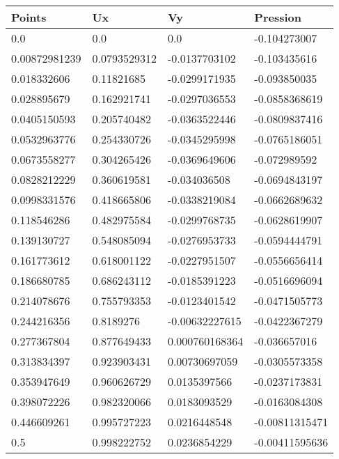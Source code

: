 \begin{tabular}{llll}
	Points & Ux & Vy & Pression \\ 
\midrule 
	0.0 & 0.0 & 0.0 & -0.104273007 \\ 
	0.00872981239 & 0.0793529312 & -0.0137703102 & -0.103435616 \\ 
	0.018332606 & 0.11821685 & -0.0299171935 & -0.093850035 \\ 
	0.028895679 & 0.162921741 & -0.0297036553 & -0.0858368619 \\ 
	0.0405150593 & 0.205740482 & -0.0363522446 & -0.0809837416 \\ 
	0.0532963776 & 0.254330726 & -0.0345295998 & -0.0765186051 \\ 
	0.0673558277 & 0.304265426 & -0.0369649606 & -0.072989592 \\ 
	0.0828212229 & 0.360619581 & -0.034036508 & -0.0694843197 \\ 
	0.0998331576 & 0.418665806 & -0.0338219084 & -0.0662689632 \\ 
	0.118546286 & 0.482975584 & -0.0299768735 & -0.0628619907 \\ 
	0.139130727 & 0.548085094 & -0.0276953733 & -0.0594444791 \\ 
	0.161773612 & 0.618001122 & -0.0227951507 & -0.0556656414 \\ 
	0.186680785 & 0.686243112 & -0.0185391223 & -0.0516696094 \\ 
	0.214078676 & 0.755793353 & -0.0123401542 & -0.0471505773 \\ 
	0.244216356 & 0.8189276 & -0.00632227615 & -0.0422367279 \\ 
	0.277367804 & 0.877649433 & 0.000760168364 & -0.036657016 \\ 
	0.313834397 & 0.923903431 & 0.00730697059 & -0.0305573358 \\ 
	0.353947649 & 0.960626729 & 0.0135397566 & -0.0237173831 \\ 
	0.398072226 & 0.982320066 & 0.0183093529 & -0.0163084308 \\ 
	0.446609261 & 0.995727223 & 0.0216448548 & -0.00811315471 \\ 
	0.5 & 0.998222752 & 0.0236854229 & -0.00411595636 \\ 
\end{tabular}
